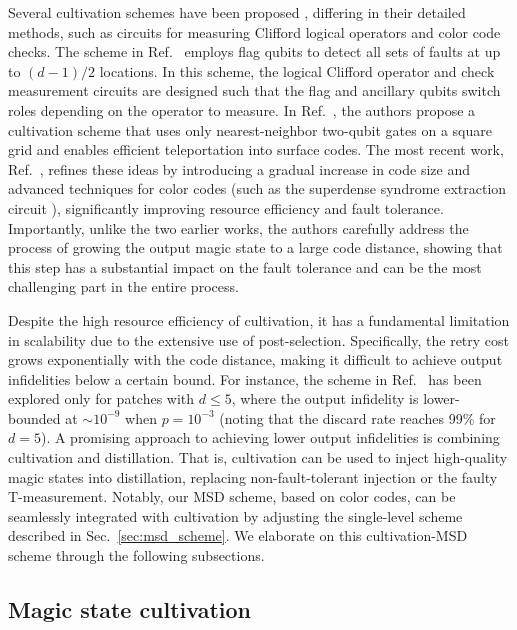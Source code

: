 \documentclass[
 prx,
 reprint,
 superscriptaddress,
 longbibliography,
 dvipsnames
]{revtex4-2}
\begin{document}
Several cultivation schemes have been proposed \cite{chamberland2020very,itogawa2024even,gidney2024magic}, differing in their detailed methods, such as circuits for measuring Clifford logical operators and color code checks.
The scheme in Ref.~\cite{chamberland2020very} employs flag qubits to detect all sets of faults at up to $(d-1)/2$ locations.
In this scheme, the logical Clifford operator and check measurement circuits are designed such that the flag and ancillary qubits switch roles depending on the operator to measure.
In Ref.~\cite{itogawa2024even}, the authors propose a cultivation scheme that uses only nearest-neighbor two-qubit gates on a square grid and enables efficient teleportation into surface codes.
The most recent work, Ref.~\cite{gidney2024magic}, refines these ideas by introducing a gradual increase in code size and advanced techniques for color codes (such as the superdense syndrome extraction circuit \cite{gidney2023new}), significantly improving resource efficiency and fault tolerance.
Importantly, unlike the two earlier works, the authors carefully address the process of growing the output magic state to a large code distance, showing that this step has a substantial impact on the fault tolerance and can be the most challenging part in the entire process.

Despite the high resource efficiency of cultivation, it has a fundamental limitation in scalability due to the extensive use of post-selection.
Specifically, the retry cost grows exponentially with the code distance, making it difficult to achieve output infidelities below a certain bound.
For instance, the scheme in Ref.~\cite{gidney2024magic} has been explored only for patches with $d \leq 5$, where the output infidelity is lower-bounded at $\sim 10^{-9}$ when $p=10^{-3}$ (noting that the discard rate reaches 99\% for $d=5$).
A promising approach to achieving lower output infidelities is combining cultivation and distillation.
That is, cultivation can be used to inject high-quality magic states into distillation, replacing non-fault-tolerant injection or the faulty T-measurement.
Notably, our MSD scheme, based on color codes, can be seamlessly integrated with cultivation by adjusting the single-level scheme described in Sec.~\ref{sec:msd_scheme}.
We elaborate on this cultivation-MSD scheme through the following subsections.

\subsection{Magic state cultivation \label{subsec:cultivation}}
\end{document}
